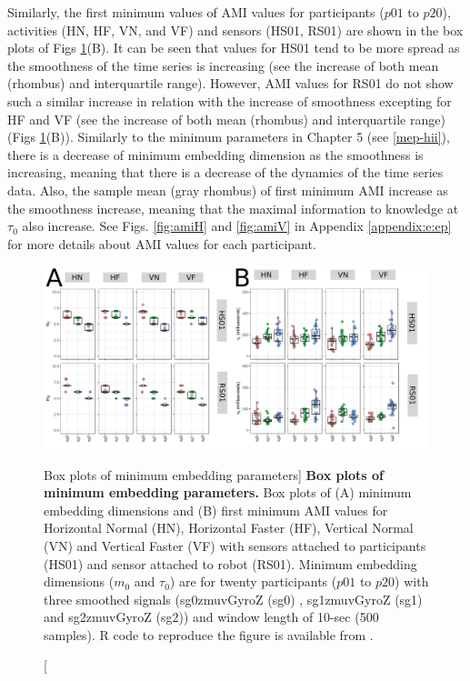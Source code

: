 Similarly, the first minimum values of AMI values 
for participants ($p01$ to $p20$), activities (HN, HF, VN, and VF) and 
sensors (HS01, RS01) are shown in the box plots of 
Figs \ref{fig:CAOAMI-hhi}(B).
It can be seen that values for HS01 tend to be more spread as the smoothness 
of the time series is increasing 
(see the increase of both mean (rhombus) and interquartile range).
However, AMI values for RS01 do not show such a similar increase in relation with
the increase of smoothness excepting for HF and VF
(see the increase of both mean (rhombus) and interquartile range) 
(Figs \ref{fig:CAOAMI-hhi}(B)).
Similarly to the minimum parameters in Chapter 5 (see \ref{mep-hii}),
there is a decrease of minimum embedding dimension as the smoothness 
is increasing, meaning that there is a decrease of the dynamics of 
the time series data. Also, the sample mean (gray rhombus) 
of first minimum AMI increase as the smoothness increase,
meaning that the maximal information to knowledge at $\tau_0$ 
also increase.
See Figs. \ref{fig:amiH} and \ref{fig:amiV} in Appendix \ref{appendix:e:ep} 
for more details about AMI values for each participant.
\begin{figure}
\centering
\includegraphics[width=1.0\textwidth]{fig_6_03}
	\caption
	[Box plots of minimum embedding parameters]{
	{\bf Box plots of minimum embedding parameters.} 
		Box plots of (A) minimum embedding dimensions 
		and (B) first minimum AMI values for 
		Horizontal Normal (HN), Horizontal Faster (HF),
		Vertical Normal (VN) and Vertical Faster (VF)
		with sensors attached to participants (HS01) and
		sensor attached to robot (RS01).
		Minimum embedding dimensions 
		($m_0$ and $\tau_0$)
		are for twenty participants 
		($p01$ to $p20$) with three smoothed signals 
		(sg0zmuvGyroZ (sg0) , sg1zmuvGyroZ (sg1) and sg2zmuvGyroZ (sg2))
		and window length of 10-sec (500 samples).
		R code to reproduce the figure is available 
		from \cite{hwum2018}.
        }
    \label{fig:CAOAMI-hhi}
\end{figure}

